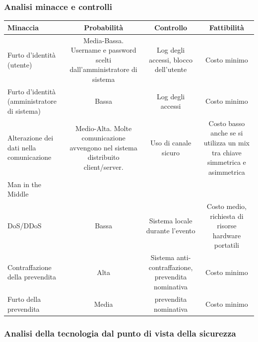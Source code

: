 \documentclass[a4paper]{article}
\begin{document}
\subsubsection{Analisi minacce e controlli}


\begin{center}
    \begin{tabulary}{1\textwidth}{|L|C|C|C|}
        \hline
        \textbf{Minaccia} & \textbf{Probabilità} & \textbf{Controllo} & \textbf{Fattibilità}  \\
        \hline
        \hline
        Furto d’identità (utente) & Media-Bassa. Username e password scelti dall'amministratore di sistema & Log degli accessi, blocco dell'utente & Costo minimo\\
        \hline
        Furto d’identità (amministratore di sistema) & Bassa & Log degli accessi & Costo minimo\\
        \hline
        Alterazione dei dati nella comunicazione & Medio-Alta. Molte comunicazione avvengono nel sistema distribuito client/server. & Uso di canale sicuro & Costo basso anche se si utilizza un mix tra chiave simmetrica e asimmetrica\\
        Man in the Middle &  &  & \\
        \hline
        DoS/DDoS & Bassa & Sistema locale durante l'evento & Costo medio, richiesta di risorse hardware portatili\\
        \hline
        Contraffazione della prevendita & Alta & Sistema anti-contraffazione, prevendita nominativa & Costo minimo\\
        \hline
        Furto della prevendita & Media & prevendita nominativa & Costo minimo\\
        \hline
    \end{tabulary}
\end{center}

\newpage

\subsubsection{Analisi della tecnologia dal punto di vista della sicurezza}
\end{document}
